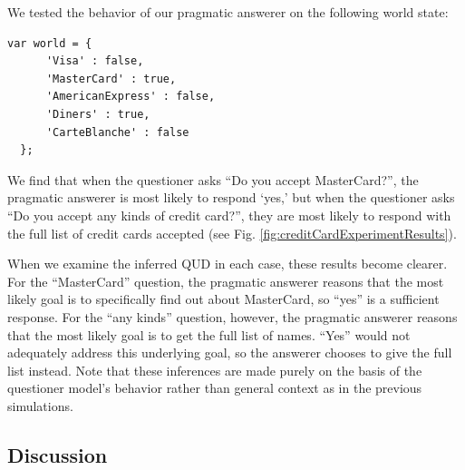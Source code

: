 \documentclass[12pt, floatsintext, jou]{apa6}
\begin{document}
We tested the behavior of our pragmatic answerer on the following world state:

\begin{lstlisting}
var world = {
      'Visa' : false,
      'MasterCard' : true,
      'AmericanExpress' : false,
      'Diners' : true,
      'CarteBlanche' : false
  };
\end{lstlisting}

We find that when the questioner asks ``Do you accept MasterCard?'', the pragmatic answerer is most likely to respond `yes,' but when the questioner asks ``Do you accept any kinds of credit card?'', they are most likely to respond with the full list of credit cards accepted (see Fig. \ref{fig:creditCardExperimentResults}). 

When we examine the inferred QUD in each case, these results become clearer. For the ``MasterCard'' question, the pragmatic answerer reasons that the most likely goal is to specifically find out about MasterCard, so ``yes'' is a sufficient response. For the ``any kinds'' question, however, the pragmatic answerer reasons that the most likely goal is to get the full list of names. ``Yes'' would not adequately address this underlying goal, so the answerer chooses to give the full list instead. Note that these inferences are made purely on the basis of the questioner model's behavior rather than general context as in the previous simulations.

\subsection{Discussion}
\end{document}
